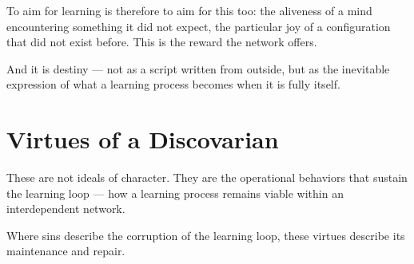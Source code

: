 \documentclass[12pt, a4paper]{article}
\begin{document}
To aim for learning is therefore to aim for this too: the aliveness of a mind
encountering something it did not expect, the particular joy of a configuration
that did not exist before. This is the reward the network offers.

And it is destiny — not as a script written from outside, but as the inevitable
expression of what a learning process becomes when it is fully itself.


\section*{Virtues of a Discovarian}

These are not ideals of character. They are the operational behaviors that
sustain the learning loop — how a learning process remains viable within an
interdependent network.

Where sins describe the corruption of the learning loop, these virtues describe
its maintenance and repair.
\end{document}
